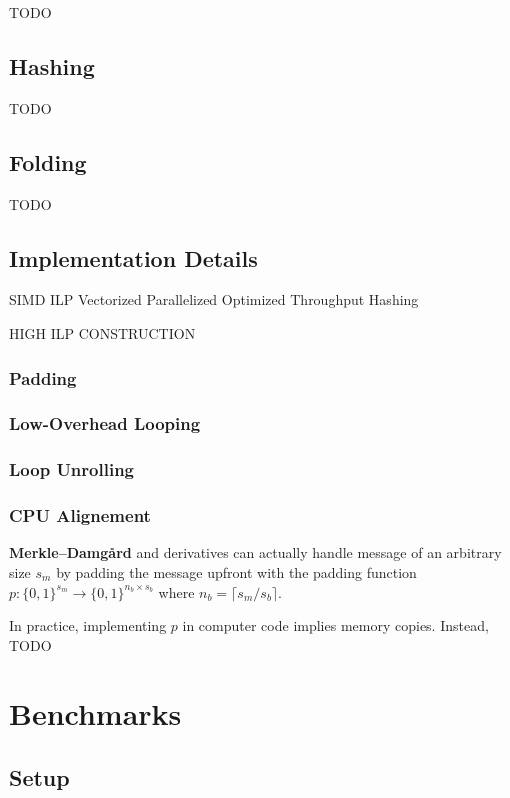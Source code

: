 \documentclass[10pt]{article}
\begin{document}
TODO

\subsection{Hashing}

TODO

\subsection{Folding}

TODO

\subsection{Implementation Details}

SIMD
ILP
Vectorized
Parallelized
Optimized
Throughput
Hashing

HIGH ILP CONSTRUCTION

\subsubsection{Padding}

\subsubsection{Low-Overhead Looping}

\subsubsection{Loop Unrolling}

\subsubsection{CPU Alignement}

\textbf{Merkle–Damgård} and derivatives can actually handle message of an arbitrary size \( s_m \) by padding the message upfront with the padding
function \( p: \{0,1\}^{s_m} \to \{0,1\}^{n_b \times s_b} \) where \( n_b = \lceil s_m/s_b \rceil \).

In practice, implementing \( p \) in computer code implies memory copies. Instead, TODO

\section{Benchmarks}
\subsection{Setup}
\end{document}
